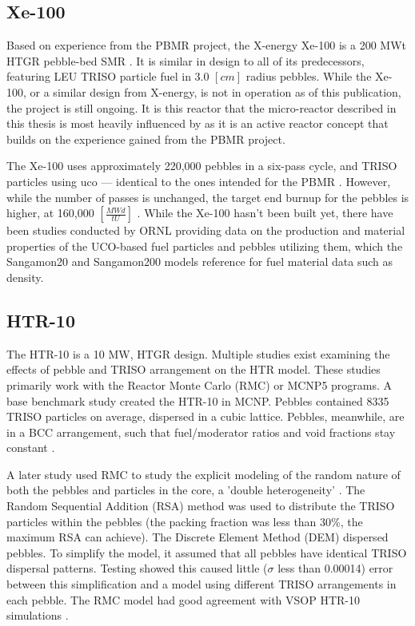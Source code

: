 \subsection{Xe-100}
\label{sec:xe-100}

Based on experience from the PBMR project, the X-energy Xe-100 is a 200 MWt HTGR pebble-bed SMR \cite{harlan_x-energy_2018, harlan_ans_2017}.  It is similar in design to all of its predecessors, featuring LEU TRISO particle fuel in 3.0 $\left[cm\right]$ radius pebbles.  While the Xe-100, or a similar design from X-energy, is not in operation as of this publication, the project is still ongoing.  It is this reactor that the micro-reactor described in this thesis is most heavily influenced by as it is an active reactor concept that builds on the experience gained from the PBMR project.

The Xe-100 uses approximately 220,000 pebbles in a six-pass cycle, and TRISO particles using \acrfull{uco} --- identical to the ones intended for the PBMR \cite{harlan_x-energy_2018}.  However, while the number of passes is unchanged, the target end burnup for the pebbles is higher, at 160,000 $\left[\frac{MWd}{tU}\right]$ \cite{agnihotri_intrinsically_2017}.  While the Xe-100 hasn't been built yet, there have been studies conducted by ORNL providing data on the production and material properties of the UCO-based fuel particles \cite{helmreich_year_2017} and pebbles utilizing them, which the Sangamon20 and Sangamon200 models reference for fuel material data such as density.

\subsection{HTR-10}

The HTR-10 is a 10 MW, HTGR design.  Multiple studies exist examining the effects of pebble and TRISO arrangement on the HTR model.  These studies primarily work with the Reactor Monte Carlo (RMC) or MCNP5 programs.  A base benchmark study created the HTR-10 in MCNP.  Pebbles contained 8335 TRISO particles on average, dispersed in a cubic lattice.  Pebbles, meanwhile, are in a BCC arrangement, such that fuel/moderator ratios and void fractions stay constant \cite{kim_monte_2005}.

A later study used RMC to study the explicit modeling of the random nature of both the pebbles and particles in the core, a 'double heterogeneity' \cite{ she_explicit_nodate}.  The Random Sequential Addition (RSA) method was used to distribute the TRISO particles within the pebbles (the packing fraction was less than 30\%, the maximum RSA can achieve).  The Discrete Element Method (DEM) dispersed pebbles.  To simplify the model, it assumed that all pebbles have identical TRISO dispersal patterns.  Testing showed this caused little ($\sigma$ less than 0.00014) error between this simplification and a model using different TRISO arrangements in each pebble.  The RMC model had good agreement with VSOP HTR-10 simulations \cite{ she_explicit_nodate}.

